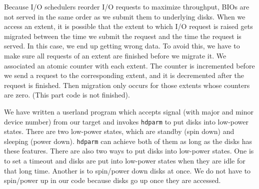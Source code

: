 Because I/O schedulers reorder I/O requests to maximize throughput,
BIOs are not served in the same order as we submit them to underlying
disks.  When we access an extent, it is possible that the extent to 
which I/O request is raised gets migrated between the time we submit the request and the
time the request is served. In this case, we end up getting wrong
data.  To avoid this, we have to make sure all requests of an extent
are finished before we migrate it. We associated an atomic counter
with each extent. The counter is incremented before we send a request
to the corresponding extent, and it is decremented after the request
is finished. Then migration only occurs for those extents whose
counters are zero.  (This part code is not finished). 

We have written a userland program which accepts signal (with major
and minor device number) from our target and invokes \texttt{hdparm}
to put disks into low-power states.  There are two low-power states,
which are standby (spin down) and sleeping (power down).
\texttt{hdparm} can achieve both of them  as long as the disks has
these features. There are also two ways to put disks into low-power
states. One is to set a timeout and disks are put into low-power
states when they are idle for that long time. Another is to spin/power
down disks at once. We do not have to spin/power up in our code
because disks go up once they are accessed. 

